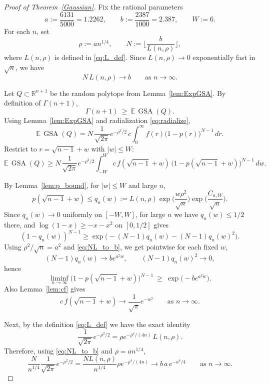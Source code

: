 \documentclass[11pt]{article}
\begin{document}
\begin{proof}[Proof of Theorem~\ref{Gaussian}]
Fix the rational parameters
\[
a:=\frac{6131}{5000}=1.2262,
\qquad
b:=\frac{2387}{1000}=2.387,
\qquad
W:=6.
\]
For each $n$, set
\[
\rho:=a n^{1/4},
\qquad
N:=\Big\lfloor \frac{b}{L(n,\rho)}\Big\rfloor,
\]
where $L(n,\rho)$ is defined in \eqref{eq:L_def}. Since $L(n,\rho)\to 0$
exponentially fast in $\sqrt{n}$, we have
\begin{equation}\label{eq:NL_to_b}
N\,L(n,\rho)\to b
\qquad\text{as }n\to\infty.
\end{equation}

Let $Q\subset\mathbb{R}^{n+1}$ be the random polytope from Lemma~\ref{lem:ExpGSA}.
By definition of $\Gamma(n+1)$,
\[
\Gamma(n+1)\ \ge\ \mathbb{E}\,\operatorname{GSA}(Q).
\]
Using Lemma~\ref{lem:ExpGSA} and radialization \eqref{eq:radialize},
\begin{equation}\label{eq:ExpGSA_radial}
\mathbb{E}\,\operatorname{GSA}(Q)
=
N\,\frac{1}{\sqrt{2\pi}}e^{-\rho^2/2}\,
c\int_0^\infty f(r)\bigl(1-p(r)\bigr)^{N-1}\,dr.
\end{equation}
Restrict to $r=\sqrt{n-1}+w$ with $|w|\le W$:
\begin{equation}\label{eq:restrictW}
\mathbb{E}\,\operatorname{GSA}(Q)
\ge
N\,\frac{1}{\sqrt{2\pi}}e^{-\rho^2/2}
\int_{-W}^{W} c\,f(\sqrt{n-1}+w)\,
\bigl(1-p(\sqrt{n-1}+w)\bigr)^{N-1}\,dw.
\end{equation}

By Lemma~\ref{lem:p_bound}, for $|w|\le W$ and large $n$,
\[
p(\sqrt{n-1}+w)\le q_n(w):=
L(n,\rho)\exp\!\Big(\frac{w\rho^2}{\sqrt{n}}\Big)\exp\!\Big(\frac{C_{a,W}}{\sqrt{n}}\Big).
\]
Since $q_n(w)\to 0$ uniformly on $[-W,W]$, for large $n$ we have $q_n(w)\le 1/2$ there,
and $\log(1-x)\ge -x-x^2$ on $[0,1/2]$ gives
\[
(1-q_n(w))^{N-1}\ge \exp\big(-(N-1)q_n(w)-(N-1)q_n(w)^2\big).
\]
Using $\rho^2/\sqrt{n}=a^2$ and \eqref{eq:NL_to_b}, we get pointwise for each fixed $w$,
\[
(N-1)q_n(w)\to b e^{a^2 w},
\qquad
(N-1)q_n(w)^2\to 0,
\]
hence
\begin{equation}\label{eq:lim_factor2}
\liminf_{n\to\infty}\bigl(1-p(\sqrt{n-1}+w)\bigr)^{N-1}
\ \ge\ \exp\big(-b e^{a^2 w}\big).
\end{equation}
Also Lemma~\ref{lem:cf} gives
\begin{equation}\label{eq:lim_factor1}
c\,f(\sqrt{n-1}+w)\to \frac{1}{\sqrt{\pi}}e^{-w^2} \qquad\text{as }n\to\infty.
\end{equation}

Next, by the definition \eqref{eq:L_def} we have the exact identity
\[
\frac{1}{\sqrt{2\pi}}e^{-\rho^2/2}=\rho e^{-\rho^4/(4n)}\,L(n,\rho).
\]
Therefore, using \eqref{eq:NL_to_b} and $\rho=a n^{1/4}$,
\begin{equation}\label{eq:prefactor_limit}
\frac{N}{n^{1/4}}\frac{1}{\sqrt{2\pi}}e^{-\rho^2/2}
=
\frac{N L(n,\rho)}{n^{1/4}}\rho e^{-\rho^4/(4n)}
\to
b\,a\,e^{-a^4/4} \qquad\text{as }n\to\infty.
\end{equation}


\end{proof}
\end{document}
